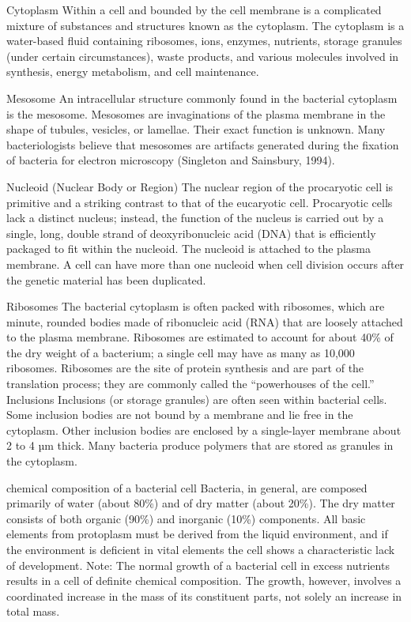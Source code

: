 \documentclass{article}
\begin{document}
Cytoplasm Within a cell and bounded by the cell membrane is a
complicated mixture of substances and structures known as the cytoplasm.
The cytoplasm is a water-based fluid containing ribosomes, ions,
enzymes, nutrients, storage granules (under certain circumstances),
waste products, and various molecules involved in synthesis, energy
metabolism, and cell maintenance.

Mesosome An intracellular structure commonly found in the bacterial
cytoplasm is the mesosome. Mesosomes are invaginations of the plasma
membrane in the shape of tubules, vesicles, or lamellae. Their exact
function is unknown. Many bacteriologists believe that mesosomes are
artifacts generated during the fixation of bacteria for electron
microscopy (Singleton and Sainsbury, 1994).

Nucleoid (Nuclear Body or Region) The nuclear region of the procaryotic
cell is primitive and a striking contrast to that of the eucaryotic
cell. Procaryotic cells lack a distinct nucleus; instead, the function
of the nucleus is carried out by a single, long, double strand of
deoxyribonucleic acid (DNA) that is efficiently packaged to fit within
the nucleoid. The nucleoid is attached to the plasma membrane. A cell
can have more than one nucleoid when cell division occurs after the
genetic material has been duplicated.

Ribosomes The bacterial cytoplasm is often packed with ribosomes, which
are minute, rounded bodies made of ribonucleic acid (RNA) that are
loosely attached to the plasma membrane. Ribosomes are estimated to
account for about 40\% of the dry weight of a bacterium; a single cell
may have as many as 10,000 ribosomes. Ribosomes are the site of protein
synthesis and are part of the translation process; they are commonly
called the ``powerhouses of the cell.'' Inclusions Inclusions (or
storage granules) are often seen within bacterial cells. Some inclusion
bodies are not bound by a membrane and lie free in the cytoplasm. Other
inclusion bodies are enclosed by a single-layer membrane about 2 to 4 µm
thick. Many bacteria produce polymers that are stored as granules in the
cytoplasm.

chemical composition of a bacterial cell Bacteria, in general, are
composed primarily of water (about 80\%) and of dry matter (about 20\%).
The dry matter consists of both organic (90\%) and inorganic (10\%)
components. All basic elements from protoplasm must be derived from the
liquid environment, and if the environment is deficient in vital
elements the cell shows a characteristic lack of development. Note: The
normal growth of a bacterial cell in excess nutrients results in a cell
of definite chemical composition. The growth, however, involves a
coordinated increase in the mass of its constituent parts, not solely an
increase in total mass.
\end{document}

